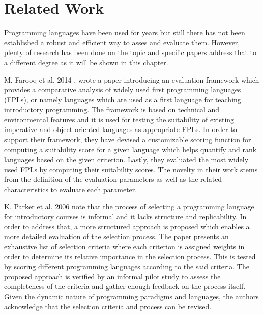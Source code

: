\chapter{Related Work}
\label{chap:related_work}

Programming languages have been used for years but still there has not been established a robust and efficient way to asses and evaluate them. However, plenty of research has been done on the topic and specific papers address that to a different degree as it will be shown in this chapter. 

M. Farooq et al. 2014 \cite{FPLEvalFramework}, wrote a paper introducing an evaluation framework which provides a comparative analysis of widely used first programming languages (FPLs), or namely languages which are used as a first language for teaching introductory programming. The framework is based on technical and environmental features and it is used for testing the suitability of existing imperative and object oriented languages as appropriate FPLs. In order to support their framework, they have devised a customizable scoring function for computing a  suitability score for a given language which helps quantify and rank languages based on the given criterion. Lastly, they evaluated the most widely used FPLs by computing their suitability scores. The novelty in their work stems from the definition of the evaluation parameters as well as the related characteristics to evaluate each parameter.

K. Parker et al. 2006 \cite{LangSelectionProcess} note that the process of selecting a programming language for introductory courses is informal and it lacks structure and replicability. In order to address that, a more structured approach is proposed which enables a more detailed evaluation of the selection process. The paper presents an exhaustive list of selection criteria  where each criterion is assigned weights in order to determine its relative importance in the selection process. This is tested by scoring different programming languages according to the said criteria. The proposed approach is verified by an informal pilot study to assess the completeness of the criteria and gather enough feedback on the process itself. Given the dynamic nature of programming paradigms and languages, the authors acknowledge that the selection criteria and process can be revised.

